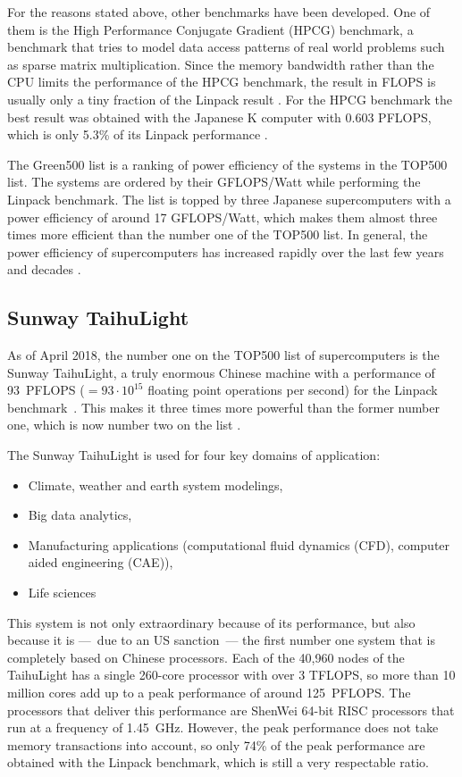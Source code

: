 For the reasons stated above, other benchmarks have been developed. One of them is the High Performance Conjugate Gradient (HPCG) benchmark, a benchmark that tries to model data access patterns of real world problems such as sparse matrix multiplication. Since the memory bandwidth rather than the CPU limits the performance of the HPCG benchmark, the result in FLOPS is usually only a tiny fraction of the Linpack result \cite{dongarra2013toward}. For the HPCG benchmark the best result was obtained with the Japanese K computer with 0.603 PFLOPS, which is only 5.3\% of its Linpack performance \cite{HPCG}.


The Green500 list is a ranking of power efficiency of the systems in the TOP500 list. The systems are ordered by their GFLOPS/Watt while performing the Linpack benchmark. The list is topped by three Japanese supercomputers with a power efficiency of around 17 GFLOPS/Watt, which makes them almost three times more efficient than the number one of the TOP500 list. In general, the power efficiency of supercomputers has increased rapidly over the last few years and decades \cite{green500}. 


\subsection{Sunway TaihuLight}
As of April 2018, the number one on the TOP500 list of supercomputers is the Sunway TaihuLight, a truly enormous Chinese machine with a performance of 93~PFLOPS ($= 93\cdot 10^{15}$ floating point operations per second) for the Linpack benchmark~\cite{fu2016sunway}. This makes it three times more powerful than the former number one, which is now number two on the list  \cite{top500sunway}. 

The Sunway TaihuLight is used for four key domains of application:
\begin{itemize}
\item Climate, weather and earth system modelings,
\item Big data analytics,
\item Manufacturing applications (computational fluid dynamics (CFD), computer aided engineering (CAE)),
\item Life sciences
\end{itemize}

This system is not only extraordinary because of its performance, but also because it is ---~due to an US sanction~--- the first number one system that is completely based on Chinese processors. Each of the 40,960 nodes of the TaihuLight has a single 260-core processor with over 3 TFLOPS, so more than 10 million cores add up to a peak performance of around 125~PFLOPS. The processors that deliver this performance are ShenWei 64-bit RISC processors that run at a frequency of 1.45~GHz. However, the peak performance does not take memory transactions into account, so only 74\% of the peak performance are obtained with the Linpack benchmark, which is still a very respectable ratio. 

